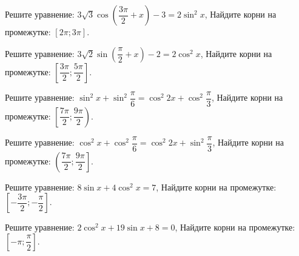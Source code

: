 \begin{class}[number=7]
	\begin{listofex}
		\item
		\begin{tasks}
			\task Решите уравнение: \( 3\sqrt{3} \cos{\left( \dfrac{3\pi}{2} + x \right)} -3=2\sin^2{x}  \),
			\task Найдите корни на промежутке: \( [2\pi;3\pi] \).
		\end{tasks}
		\item
		\begin{tasks}
			\task Решите уравнение: \( 3\sqrt{2}\sin{\left( \dfrac{\pi}{2} + x \right)} -2 = 2\cos^2{x} \),
			\task Найдите корни на промежутке: \( \left[ \dfrac{3\pi}{2}; \dfrac{5\pi}{2} \right] \).
		\end{tasks}
		\item
		\begin{tasks}
			\task Решите уравнение: \( \sin^2{x}+\sin^2{\dfrac{\pi}{6}}= \cos^2{2x} + \cos^2{\dfrac{\pi}{3}} \),
			\task Найдите корни на промежутке: \( \left[ \dfrac{7\pi}{2}; \dfrac{9\pi}{2} \right) \).
		\end{tasks}
		\item
		\begin{tasks}
			\task Решите уравнение: \( \cos^2{x}+\cos^2{\dfrac{\pi}{6}} = \cos^2{2x} + \sin^2{\dfrac{\pi}{3}} \),
			\task Найдите корни на промежутке: \( \left( \dfrac{7\pi}{2}; \dfrac{9\pi}{2} \right] \).
		\end{tasks}
		\item
		\begin{tasks}
			\task Решите уравнение: \( 8 \sin{x}+4\cos^2{x}=7 \),
			\task Найдите корни на промежутке: \( \left[ -\dfrac{3\pi}{2}; -\dfrac{\pi}{2} \right]  \).
		\end{tasks}
		\item
		\begin{tasks}
			\task Решите уравнение: \( 2 \cos^2{x} + 19 \sin{x}+8=0 \),
			\task Найдите корни на промежутке: \( \left[ -\pi; \dfrac{\pi}{2} \right]  \).
		\end{tasks}
	\end{listofex}
\end{class}


